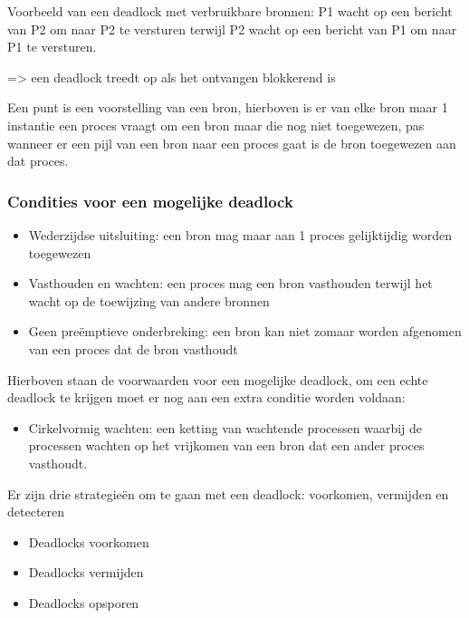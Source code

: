 Voorbeeld van een deadlock met verbruikbare bronnen: P1 wacht op een bericht van P2 om naar P2 te versturen terwijl P2 wacht op een bericht van P1 om naar P1 te versturen.

=> een deadlock treedt op als het ontvangen blokkerend is


Een punt is een voorstelling van een bron, hierboven is er van elke bron maar 1 instantie een proces vraagt om een bron maar die nog niet toegewezen, pas wanneer er een pijl van een bron naar een proces gaat is de bron toegewezen aan dat proces.



\subsubsection{Condities voor een mogelijke deadlock}

\begin{itemize}
\item Wederzijdse uitsluiting: een bron mag maar aan 1 proces gelijktijdig worden toegewezen
\item Vasthouden en wachten: een proces mag een bron vasthouden terwijl het wacht op de toewijzing van andere bronnen
\item Geen preëmptieve onderbreking: een bron kan niet zomaar worden afgenomen van een proces dat de bron vasthoudt
\end{itemize}

Hierboven staan de voorwaarden voor een mogelijke deadlock, om een echte deadlock te krijgen moet er nog aan een extra conditie worden voldaan:

\begin{itemize}
\item Cirkelvormig wachten: een ketting van wachtende processen waarbij de processen wachten op het vrijkomen van een bron dat een ander proces vasthoudt.
\end{itemize}

Er zijn drie strategieën om te gaan met een deadlock: voorkomen, vermijden en detecteren

\begin{itemize}
    \item Deadlocks voorkomen
    \item Deadlocks vermijden
    \item Deadlocks opsporen
\end{itemize}
